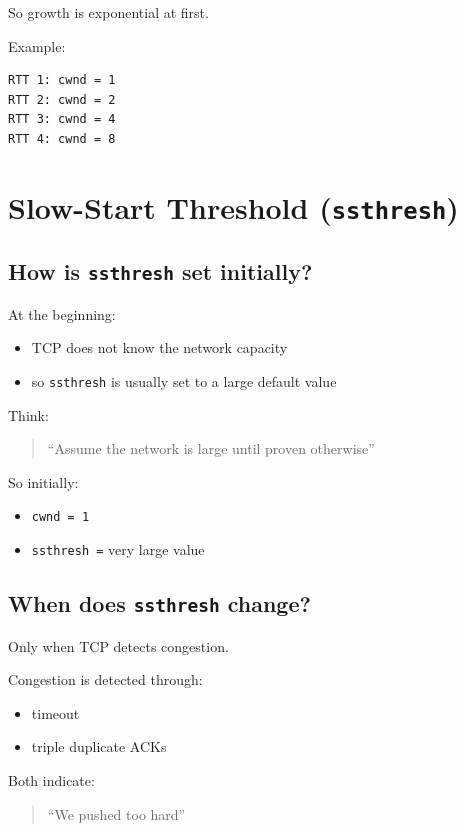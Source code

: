 So growth is exponential at first.

Example:

\begin{verbatim}
RTT 1: cwnd = 1
RTT 2: cwnd = 2
RTT 3: cwnd = 4
RTT 4: cwnd = 8
\end{verbatim}

\section{Slow-Start Threshold (\texttt{ssthresh})}

\subsection*{How is \texttt{ssthresh} set initially?}

At the beginning:
\begin{itemize}
    \item TCP does not know the network capacity
    \item so \texttt{ssthresh} is usually set to a large default value
\end{itemize}

Think:

\begin{quote}
“Assume the network is large until proven otherwise”
\end{quote}

So initially:
\begin{itemize}
    \item \texttt{cwnd = 1}
    \item \texttt{ssthresh =} very large value
\end{itemize}

\subsection*{When does \texttt{ssthresh} change?}

Only when TCP detects congestion.

Congestion is detected through:
\begin{itemize}
    \item timeout
    \item triple duplicate ACKs
\end{itemize}

Both indicate:

\begin{quote}
“We pushed too hard”
\end{quote}

